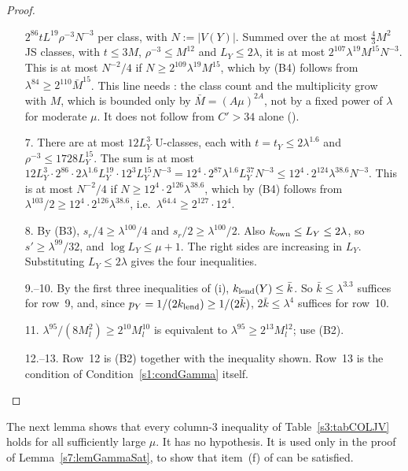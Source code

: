 \begin{proof}
\begin{itemize}
  $2^{86}tL^{19}\rho^{-3}N^{-3}$ per class, with $N:=|V(Y)|$. Summed over
  the at most $\frac43M^2$ JS classes, with $t\le3M$, $\rho^{-3}\le M^{12}$
  and $L_Y\le2\lambda$, it is at most $2^{107}\lambda^{19}M^{15}N^{-3}$.
  This is at most $N^{-2}/4$ if $N\ge2^{109}\lambda^{19}M^{15}$, which by
  (B4) follows from $\lambda^{84}\ge2^{110}\bar M^{15}$. This line
  needs : the class count and the multiplicity grow with $M$,
  which is bounded only by $\bar M=(A\mu)^{2A}$, not by a fixed power of
  $\lambda$ for moderate $\mu$. It
  does not follow from $C'>34$ alone ().
\item[7.] There are at most $12L_Y^3$ U-classes, each with
  $t=t_Y\le2\lambda^{1.6}$ and $\rho^{-3}\le1728L_Y^{15}$. The sum is at most
  $12L_Y^3\cdot2^{86}\cdot2\lambda^{1.6}L_Y^{19}\cdot12^3L_Y^{15}N^{-3}
  =12^4\cdot2^{87}\lambda^{1.6}L_Y^{37}N^{-3}\le12^4\cdot2^{124}\lambda^{38.6}N^{-3}$.
  This is at most $N^{-2}/4$ if $N\ge12^4\cdot2^{126}\lambda^{38.6}$,
  which by (B4) follows from
  $\lambda^{103}/2\ge12^4\cdot2^{126}\lambda^{38.6}$, i.e.\
  $\lambda^{64.4}\ge2^{127}\cdot12^4$.
\item[8.] By (B3), $s_r/4\ge\lambda^{100}/4$ and $s_r/2\ge\lambda^{100}/2$.
  Also $k_{\mathrm{own}}\le L_Y\le2\lambda$, so $s'\ge\lambda^{99}/32$, and
  $\log L_Y\le\mu+1$. The right sides are increasing in $L_Y$.
  Substituting $L_Y\le2\lambda$ gives the four inequalities.
\item[9.--10.] By the first three inequalities of (i),
  $k_{\mathrm{lend}}(Y)\le\bar k$. So $\bar k\le\lambda^{3.3}$ suffices for row~9,
  and, since $p_Y=1/(2k_{\mathrm{lend}})\ge1/(2\bar k)$, $2\bar k\le\lambda^4$
  suffices for row~10.
\item[11.] $\lambda^{95}/(8M_l^2)\ge2^{10}M_l^{10}$ is equivalent to
  $\lambda^{95}\ge2^{13}M_l^{12}$; use (B2).
\item[12.--13.] Row~12 is (B2) together with the inequality shown. Row~13
  is the condition \Gstar of Condition~\ref{s1:condGamma} itself.
\end{itemize}
\end{proof}

The next lemma shows that every column-3 inequality of
Table~\ref{s3:tabCOLJV} holds for all sufficiently large $\mu$. It has no
hypothesis. It is used only in the proof of Lemma~\ref{s7:lemGammaSat}, to show
that item~(f) of \Gc{1} can be satisfied.

